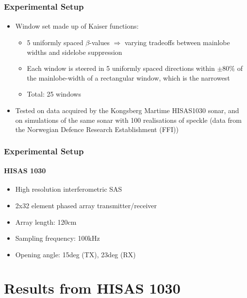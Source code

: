 \documentclass[
    beamer                                       %
 , xelatex                                      %
]{common/mytemplate}
\begin{document}
\begin{frame}
\frametitle{Experimental Setup}
\framesubtitle{}
\vspace{-3pt}
\begin{itemize}
\item Window set made up of Kaiser functions:
\begin{itemize}
\item 5 uniformly spaced $\beta$-values $\Rightarrow$ varying tradeoffs between mainlobe widths and sidelobe suppression
\item Each window is steered in 5 uniformly spaced directions within $\pm$80\% of the mainlobe-width of a rectangular window, which is the narrowest
\item Total: 25 windows
\end{itemize}
\item Tested on data acquired by the Kongsberg Martime HISAS1030 sonar, and on simulations of the same sonar with 100 realisations of speckle (data from the Norwegian Defence Research Establishment (FFI))
\end{itemize}
\end{frame}


\begin{frame}
\frametitle{Experimental Setup}
\framesubtitle{HISAS 1030}
\begin{figure}[H]
\end{figure}
\begin{itemize}
\item High resolution interferometric SAS
\item 2x32 element phased array transmitter/receiver
\item Array length: 120cm
\item Sampling frequency: 100kHz
\item Opening angle: 15deg (TX), 23deg (RX)
\end{itemize}
\end{frame}

\section{Results from HISAS 1030}
\end{document}
